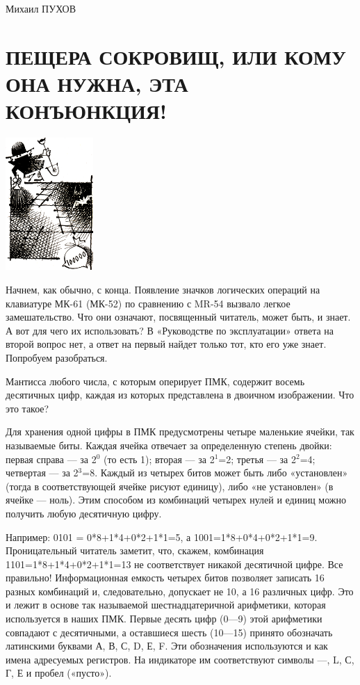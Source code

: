\documentclass[11pt,a4paper,oneside]{article}
\begin{document}
Михаил ПУХОВ

\section{ПЕЩЕРА СОКРОВИЩ, ИЛИ КОМУ ОНА НУЖНА, ЭТА КОНЪЮНКЦИЯ!}
\includegraphics[width=0.25\textwidth]{treasure1}

Начнем, как обычно, с конца. Появление значков логических операций на клавиатуре МК-61 (МК-52) по сравнению с MR-54 вызвало легкое замешательство. Что они означают, посвященный читатель, может быть, и знает. А вот для чего их использовать? В «Руководстве по эксплуатации» ответа на второй вопрос нет, а ответ на первый найдет только тот, кто его уже знает. Попробуем разобраться.

Мантисса любого числа, с которым оперирует ПМК, содержит восемь десятичных цифр, каждая из которых представлена в двоичном изображении. Что это такое?

Для хранения одной цифры в ПМК предусмотрены четыре маленькие ячейки, так называемые биты. Каждая ячейка отвечает за определенную степень двойки: первая справа — за 2$^{0}$ (то есть 1); вторая — за 2$^{1}$=2; третья — за 2$^{2}$=4; четвертая — за 2$^{3}$=8. Каждый из четырех битов может быть либо «установлен» (тогда в соответствующей ячейке рисуют единицу), либо «не установлен» (в ячейке — ноль). Этим способом из комбинаций четырех нулей и единиц можно получить любую десятичную цифру.

Например: 0101 = 0*8+1*4+0*2+1*1=5, а 1001=1*8+0*4+0*2+1*1=9. Проницательный читатель заметит, что, скажем, комбинация 1101=1*8+1*4+0*2+1*1=13 не соответствует никакой десятичной цифре. Все правильно! Информационная емкость четырех битов позволяет записать 16 разных комбинаций и, следовательно, допускает не 10, а 16 различных цифр. Это и лежит в основе так называемой шестнадцатеричной арифметики, которая используется в наших ПМК. Первые десять цифр (0—9) этой арифметики совпадают с десятичными, а оставшиеся шесть (10—15) принято обозначать латинскими буквами А, В, С, D, Е, F. Эти обозначения используются и как имена адресуемых регистров. На индикаторе им соответствуют символы —, L, С, Г, Е и пробел («пусто»).
\end{document}
